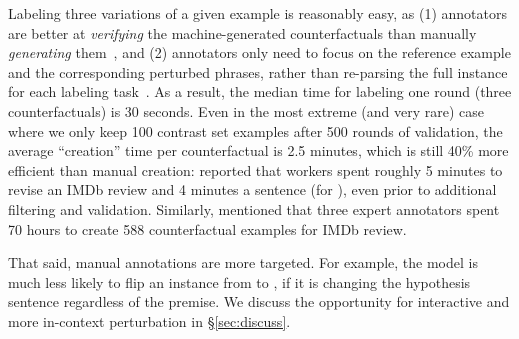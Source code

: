 Labeling three variations of a given example is reasonably easy, as (1) annotators are better at \emph{verifying} the machine-generated counterfactuals than manually \emph{generating} them~\cite{ribeiro2018sear}, and (2) annotators only need to focus on the reference example and the corresponding perturbed phrases, rather than re-parsing the full instance for each labeling task~\cite{Khashabi2020MoreBF}.
As a result, the median time for labeling one round (three counterfactuals) is 30 seconds.
Even in the most extreme (and very rare) case where we only keep 100 contrast set examples after 500 rounds of validation, the average ``creation'' time per counterfactual is 2.5 minutes, which is still 40\% more efficient than manual creation:
\citet{kaushik2019learning} reported that workers spent roughly 5 minutes to revise an IMDb review and 4 minutes a sentence (for \nli), even prior to additional filtering and validation.
Similarly, \citet{gardner2020contrast} mentioned that three expert annotators spent 70 hours to create 588 counterfactual examples for IMDb review.



That said, manual annotations are more targeted. 
For example, the model is much less likely to flip an \nli instance from  to , if it is changing the hypothesis sentence regardless of the premise.
We discuss the opportunity for interactive and more in-context perturbation in \S\ref{sec:discuss}.







